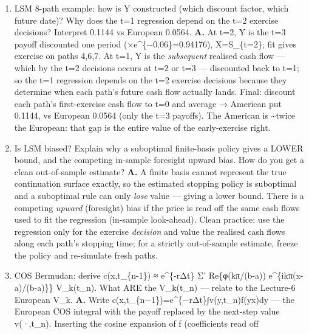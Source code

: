 \documentclass[
  11pt,
]{article}
\begin{document}
\begin{enumerate}
  ITM paths because OTM paths have zero intrinsic and would never
  exercise --- restricting fits the conditional expectation only where
  the decision matters (cheaper and more accurate). The realised
  \emph{cash flow} used is the path's actual intrinsic when
  Λ\textgreater ĉ, not the fitted ĉ: ĉ is only a noisy decision rule,
  while the realised payoff is the unbiased value collected on that
  path.
\item
  LSM 8-path example: how is Y constructed (which discount factor, which
  future date)? Why does the t=1 regression depend on the t=2 exercise
  decisions? Interpret 0.1144 vs European 0.0564. \textbf{A.} At t=2, Y
  is the t=3 payoff discounted one period (×e\^{}\{−0.06\}=0.94176),
  X=S\_\{t=2\}; fit gives exercise on paths 4,6,7. At t=1, Y is the
  \emph{subsequent} realised cash flow --- which by the t=2 decisions
  occurs at t=2 or t=3 --- discounted back to t=1; so the t=1 regression
  depends on the t=2 exercise decisions because they determine when each
  path's future cash flow actually lands. Final: discount each path's
  first-exercise cash flow to t=0 and average → American put 0.1144, vs
  European 0.0564 (only the t=3 payoffs). The American is
  \textasciitilde twice the European: that gap is the entire value of
  the early-exercise right.
\item
  Is LSM biased? Explain why a suboptimal finite-basis policy gives a
  LOWER bound, and the competing in-sample foresight upward bias. How do
  you get a clean out-of-sample estimate? \textbf{A.} A finite basis
  cannot represent the true continuation surface exactly, so the
  estimated stopping policy is suboptimal and a suboptimal rule can only
  \emph{lose} value --- giving a lower bound. There is a competing
  \emph{upward} (foresight) bias if the price is read off the same cash
  flows used to fit the regression (in-sample look-ahead). Clean
  practice: use the regression only for the exercise \emph{decision} and
  value the realised cash flows along each path's stopping time; for a
  strictly out-of-sample estimate, freeze the policy and re-simulate
  fresh paths.
\item
  COS Bermudan: derive c(x,t\_\{n-1\}) ≈ e\^{}\{-rΔt\} Σ'
  Re\{φ(kπ/(b-a)) e\^{}\{ikπ(x-a)/(b-a)\}\} V\_k(t\_n). What ARE the
  V\_k(t\_n) --- relate to the Lecture-6 European V\_k. \textbf{A.}
  Write c(x,t\_\{n−1\})=e\^{}\{−rΔt\}∫v(y,t\_n)f(y\textbar x)dy --- the
  European COS integral with the payoff replaced by the next-step value
  v(·,t\_n). Inserting the cosine expansion of f (coefficients read off

\end{enumerate}
\end{document}
